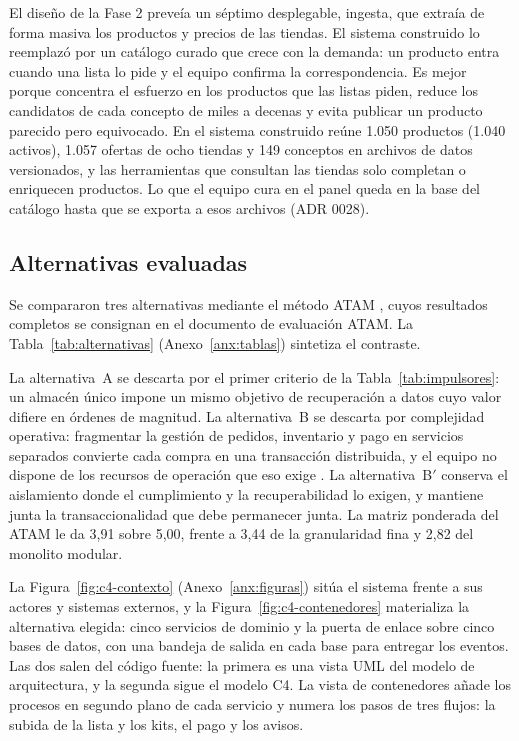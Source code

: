 El diseño de la
Fase 2 preveía un séptimo desplegable, ingesta, que extraía de forma masiva los productos y
precios de las tiendas. El sistema construido lo reemplazó por un catálogo curado que crece
con la demanda: un producto entra cuando una lista lo pide y el equipo confirma la
correspondencia. Es mejor porque concentra el esfuerzo en los productos que las listas
piden, reduce los candidatos de cada concepto de miles a decenas y evita publicar un
producto parecido pero equivocado. En el sistema construido reúne 1.050 productos (1.040
activos), 1.057 ofertas de ocho tiendas y 149 conceptos en archivos de datos versionados, y las herramientas que
consultan las tiendas solo completan o enriquecen productos. Lo que el equipo cura en el
panel queda en la base del catálogo hasta que se exporta a esos archivos (ADR 0028).

\subsection{Alternativas evaluadas}
\label{sec:alternativas}

Se compararon tres alternativas mediante el método ATAM \citep{bass_software_2021}, cuyos
resultados completos se consignan en el documento de evaluación ATAM. La
Tabla~\ref{tab:alternativas} (Anexo~\ref{anx:tablas}) sintetiza el contraste.


La alternativa~A se descarta por el primer criterio de la Tabla~\ref{tab:impulsores}: un
almacén único impone un mismo objetivo de recuperación a datos cuyo valor difiere en
órdenes de magnitud. La alternativa~B se descarta por complejidad operativa: fragmentar la
gestión de pedidos, inventario y pago en servicios separados convierte cada compra en una
transacción distribuida, y el equipo no dispone de los recursos de operación que eso exige
\citep{newman_building_2021}. La alternativa~B$'$ conserva el aislamiento donde el
cumplimiento y la recuperabilidad lo exigen, y mantiene junta la transaccionalidad que
debe permanecer junta. La matriz ponderada del ATAM le da 3,91 sobre 5,00, frente a 3,44 de
la granularidad fina y 2,82 del monolito modular.

La Figura~\ref{fig:c4-contexto} (Anexo~\ref{anx:figuras}) sitúa el sistema frente a sus actores y sistemas externos, y
la Figura~\ref{fig:c4-contenedores} materializa la alternativa elegida: cinco servicios de
dominio y la puerta de enlace sobre cinco bases de datos, con una bandeja de salida en cada
base para entregar los eventos. Las dos salen del código fuente: la primera es una vista UML
del modelo de arquitectura, y la segunda sigue el modelo C4. La vista de contenedores añade los procesos en segundo plano de cada servicio y numera
los pasos de tres flujos: la subida de la lista y los kits, el pago y los avisos.

